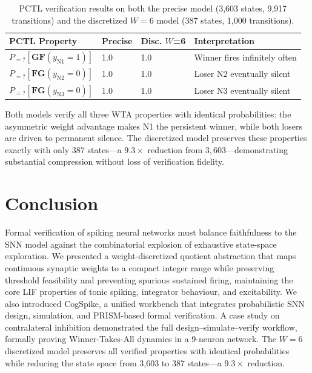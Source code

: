 \documentclass[runningheads]{llncs}
\begin{document}
\begin{table}[t]
\caption{PCTL verification results on both the precise model (3,603 states, 9,917
  transitions) and the discretized $W = 6$ model (387 states, 1,000
  transitions).}
\label{tab:wta}
\centering
\setlength{\tabcolsep}{8pt}
\renewcommand{\arraystretch}{1.25}
\begin{tabular}{llll}
\hline
\textbf{PCTL Property} & \textbf{Precise} & \textbf{Disc. $W$=6} &
  \textbf{Interpretation}\\
\hline
$P_{=?}[\mathbf{G}\mathbf{F}(y_{\mathrm{N1}} = 1)]$ & 1.0 & 1.0 &
  Winner fires infinitely often\\
$P_{=?}[\mathbf{F}\mathbf{G}(y_{\mathrm{N2}} = 0)]$ & 1.0 & 1.0 &
  Loser N2 eventually silent\\
$P_{=?}[\mathbf{F}\mathbf{G}(y_{\mathrm{N3}} = 0)]$ & 1.0 & 1.0 &
  Loser N3 eventually silent\\
\hline
\end{tabular}
\end{table}

Both models verify all three WTA properties with identical probabilities: the
asymmetric weight advantage makes N1 the persistent winner, while both losers are
driven to permanent silence. The discretized model preserves these properties
exactly with only $387$ states---a $9.3\times$ reduction from $3{,}603$---demonstrating
substantial compression without loss of verification fidelity.


\section{Conclusion}\label{sec:conclusion}

Formal verification of spiking neural networks must balance faithfulness to the
SNN model against the combinatorial explosion of exhaustive state-space
exploration. We presented a weight-discretized quotient abstraction that maps
continuous synaptic weights to a compact integer range while preserving threshold
feasibility and preventing spurious sustained firing, maintaining the core LIF
properties of tonic spiking, integrator behaviour, and excitability. We also
introduced CogSpike, a unified workbench that integrates probabilistic SNN
design, simulation, and PRISM-based formal verification. A case study on
contralateral inhibition demonstrated the full design--simulate--verify workflow,
formally proving Winner-Takes-All dynamics in a 9-neuron network. The $W = 6$
discretized model preserves all verified properties with identical probabilities
while reducing the state space from 3,603 to 387 states---a $9.3\times$ reduction.
\end{document}
